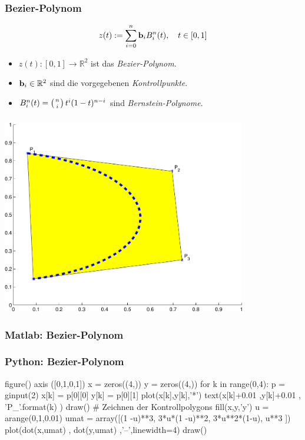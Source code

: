 \documentclass[hyperref={xetex}]{beamer}
\begin{document}
%
%
\begin{frame}[fragile]\frametitle{Bezier-Polynom}
\alert{ \[ z (t):=\sum_{i=0}^n {\bf b}_i B_i^n(t), \quad t \in [0,1] \]}
\begin{itemize}
\item $z(t): [0,1] \rightarrow \mathbb{R}^2$ ist das {\it Bezier-Polynom}.
\item ${\bf b}_i \in \mathbb{R}^2$ sind die vorgegebenen 
{\it Kontrollpunkte}.
\item $B_i^n(t)=\left( n \atop i \right) t^i (1-t)^{n-i}$ sind 
{\it Bernstein-Polynome}.
\end{itemize}
\end{frame}
%
%
\begin{frame}[fragile]\frametitle{}
\begin{center}\includegraphics[width=0.8\textwidth]{figures/bezier}\end{center}
\end{frame}
%
%
\begin{frame}[fragile]\frametitle{Matlab: Bezier-Polynom}
\end{frame}
%
%
\begin{frame}[fragile]\frametitle{Python: Bezier-Polynom}
  \begin{pyin}
figure()
axis ([0,1,0,1])
x = zeros((4,))
y = zeros((4,))
for k  in range(0,4):
    p = ginput(2)
    x[k] = p[0][0]
    y[k] = p[0][1]
    plot(x[k],y[k],'*')
    text(x[k]+0.01 ,y[k]+0.01 , 'P_{}'.format(k) )
    draw()
# Zeichnen der Kontrollpolygons
fill(x,y,'y')
u = arange(0,1,0.01)
umat = array([(1 -u)**3, 3*u*(1 -u)**2, 3*u**2*(1-u), u**3 ])
plot(dot(x,umat) , dot(y,umat) ,'--',linewidth=4)
draw()    
  \end{pyin}
\end{frame}
\end{document}
